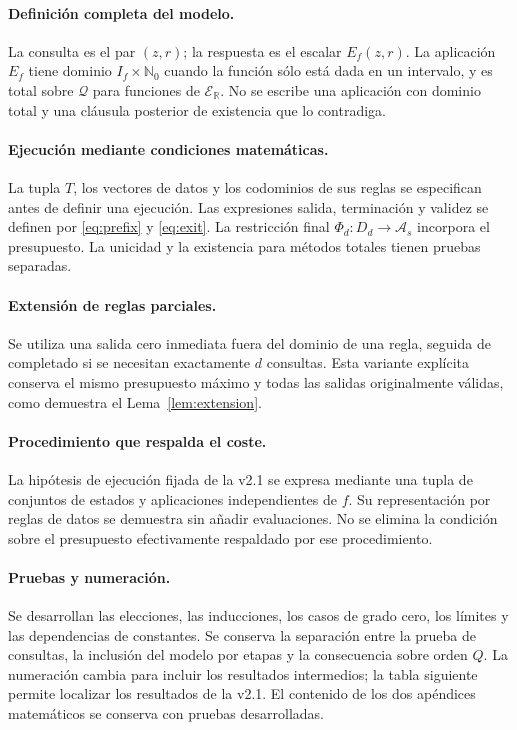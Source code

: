 \documentclass[11pt,a4paper]{article}
\numberwithin{equation}{section}
\theoremstyle{definition}
\theoremstyle{remark}
\newcommand{\R}{\mathbb R}
\newcommand{\Nn}{\mathbb N_0}
\newcommand{\ER}{\mathcal E_{\R}}
\newcommand{\QQ}{\mathcal Q}
\begin{document}
\paragraph{Definición completa del modelo.}
La consulta es el par $(z,r)$; la respuesta es el escalar $E_f(z,r)$. La aplicación $E_f$ tiene dominio $I_f\times\Nn$ cuando la función sólo está dada en un intervalo, y es total sobre $\QQ$ para funciones de $\ER$. No se escribe una aplicación con dominio total y una cláusula posterior de existencia que lo contradiga.

\paragraph{Ejecución mediante condiciones matemáticas.}
La tupla $T$, los vectores de datos y los codominios de sus reglas se especifican antes de definir una ejecución. Las expresiones salida, terminación y validez se definen por \eqref{eq:prefix} y \eqref{eq:exit}. La restricción final $\Phi_d:D_d\to\mathcal A_s$ incorpora el presupuesto. La unicidad y la existencia para métodos totales tienen pruebas separadas.

\paragraph{Extensión de reglas parciales.}
Se utiliza una salida cero inmediata fuera del dominio de una regla, seguida de completado si se necesitan exactamente $d$ consultas. Esta variante explícita conserva el mismo presupuesto máximo y todas las salidas originalmente válidas, como demuestra el Lema~\ref{lem:extension}.

\paragraph{Procedimiento que respalda el coste.}
La hipótesis de ejecución fijada de la v2.1 se expresa mediante una tupla de conjuntos de estados y aplicaciones independientes de $f$. Su representación por reglas de datos se demuestra sin añadir evaluaciones. No se elimina la condición sobre el presupuesto efectivamente respaldado por ese procedimiento.

\paragraph{Pruebas y numeración.}
Se desarrollan las elecciones, las inducciones, los casos de grado cero, los límites y las dependencias de constantes. Se conserva la separación entre la prueba de consultas, la inclusión del modelo por etapas y la consecuencia sobre orden $Q$. La numeración cambia para incluir los resultados intermedios; la tabla siguiente permite localizar los resultados de la v2.1. El contenido de los dos apéndices matemáticos se conserva con pruebas desarrolladas.
\end{document}
